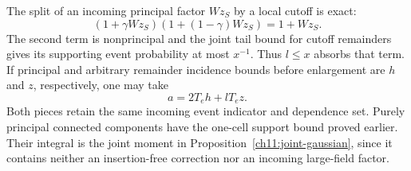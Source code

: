 The split of an incoming principal factor $Wz_S$ by a local cutoff is
exact:
\[
 (1+\gamma Wz_S)(1+(1-\gamma)Wz_S)=1+Wz_S .
\]
The second term is nonprincipal and the joint tail bound for cutoff remainders gives
its supporting event probability at most $x^{-1}$.
Thus $l\le x$ absorbs that term. If principal and arbitrary remainder
incidence bounds before enlargement are $h$ and $z$, respectively,
one may take
\begin{equation}
 a=2T_eh+lT_ez.
 \label{ch11:marked-incidence}
\end{equation}
Both pieces retain the same incoming event indicator and dependence set.
Purely principal connected components have the one-cell support
bound proved earlier. Their integral is the joint moment
in Proposition~\ref{ch11:joint-gaussian}, since it contains neither
an insertion-free correction nor an incoming large-field factor.

